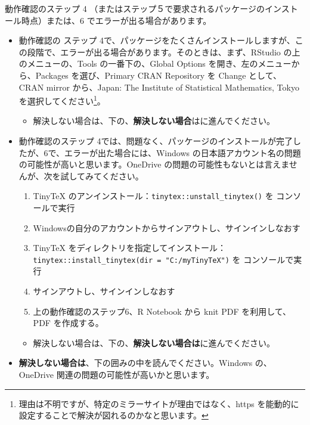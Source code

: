 \documentclass[
]{bxjsbook}
\providecommand{\tightlist}{%
  \setlength{\itemsep}{0pt}\setlength{\parskip}{0pt}}
\theoremstyle{definition}
\theoremstyle{definition}
\theoremstyle{definition}
\theoremstyle{definition}
\theoremstyle{remark}
\begin{document}
動作確認のステップ 4 （またはステップ５で要求されるパッケージのインストール時点）または、6 でエラーが出る場合があります。

\begin{itemize}
\item
  動作確認の ステップ 4で、パッケージをたくさんインストールしますが、この段階で、エラーが出る場合があります。そのときは、まず、RStudio の上のメニューの、Tools の一番下の、Global Options を開き、左のメニューから、Packages を選び、Primary CRAN Repository を Change として、CRAN mirror から、Japan: The Institute of Statistical Mathematics, Tokyo を選択してください\footnote{理由は不明ですが、特定のミラーサイトが理由ではなく、https を能動的に設定することで解決が図れるのかなと思います。}。

  \begin{itemize}
  \tightlist
  \item
    解決しない場合は、下の、\textbf{解決しない場合}はに進んでください。
  \end{itemize}
\item
  動作確認のステップ 4では、問題なく、パッケージのインストールが完了したが、6で、エラーが出た場合には、Windows の日本語アカウント名の問題の可能性が高いと思います。OneDrive の問題の可能性もないとは言えませんが、次を試してみてください。

  \begin{enumerate}
  \def\labelenumi{\arabic{enumi}.}
  \tightlist
  \item
    TinyTeX のアンインストール：\texttt{tinytex::unstall\_tinytex()} を コンソールで実行
  \item
    Windowsの自分のアカウントからサインアウトし、サインインしなおす
  \item
    TinyTeX をディレクトリを指定してインストール：\texttt{tinytex::install\_tinytex(dir\ =\ "C:/myTinyTeX")} を コンソールで実行
  \item
    サインアウトし、サインインしなおす
  \item
    上の動作確認のステップ6、R Notebook から knit PDF を利用して、PDF を作成する。
  \end{enumerate}

  \begin{itemize}
  \tightlist
  \item
    解決しない場合は、下の、\textbf{解決しない場合は}に進んでください。
  \end{itemize}
\item
  \textbf{解決しない場合は}、下の囲みの中を読んでください。Windows の、OneDrive 関連の問題の可能性が高いかと思います。


\end{itemize}
\end{document}
